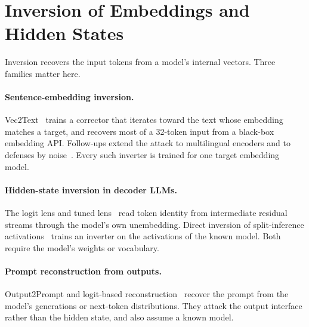 \section{Inversion of Embeddings and Hidden States}\label{sec:lit:inversion}

Inversion recovers the input tokens from a model's internal vectors. Three families matter here.

\paragraph{Sentence-embedding inversion.} Vec2Text~ trains a corrector that iterates toward the text whose embedding matches a target, and recovers most of a 32-token input from a black-box embedding API. Follow-ups extend the attack to multilingual encoders and to defenses by noise~. Every such inverter is trained for one target embedding model.

\paragraph{Hidden-state inversion in decoder LLMs.} The logit lens and tuned lens~ read token identity from intermediate residual streams through the model's own unembedding. Direct inversion of split-inference activations~ trains an inverter on the activations of the known model. Both require the model's weights or vocabulary.

\paragraph{Prompt reconstruction from outputs.} Output2Prompt and logit-based reconstruction~ recover the prompt from the model's generations or next-token distributions. They attack the output interface rather than the hidden state, and also assume a known model.

